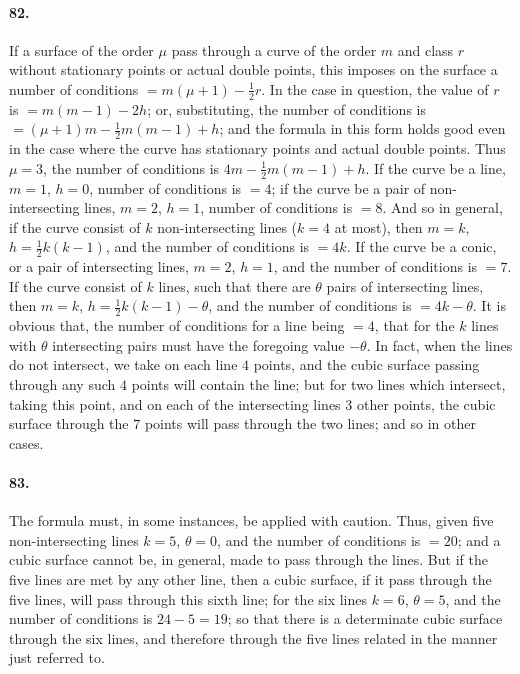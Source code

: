 \documentclass[11pt]{article}
\begin{document}
\paragraph{82.}
If a surface of the order $\mu$ pass through a curve of the order $m$
and class $r$ without stationary points or actual double points, this
imposes on the surface a number of conditions
$=m(\mu+1)-\tfrac{1}{2}r$. In the case in question, the value of $r$ is
$=m(m-1)-2h$; or, substituting, the number of conditions is
$=(\mu+1)m-\tfrac{1}{2}m(m-1)+h$; and the formula in this form holds
good even in the case where the curve has stationary points and actual
double points. Thus $\mu=3$, the number of conditions is
$4m-\tfrac{1}{2}m(m-1)+h$. If the curve be a line, $m=1$, $h=0$, number
of conditions is $=4$; if the curve be a pair of non-intersecting lines,
$m=2$, $h=1$, number of conditions is $=8$. And so in general, if the
curve consist of $k$ non-intersecting lines ($k=4$ at most), then $m=k$,
$h=\tfrac{1}{2}k(k-1)$, and the number of conditions is $=4k$. If the
curve be a conic, or a pair of intersecting lines, $m=2$, $h=1$, and the
number of conditions is $=7$. If the curve consist of $k$ lines, such
that there are $\theta$ pairs of intersecting lines, then $m=k$,
$h=\tfrac{1}{2}k(k-1)-\theta$, and the number of conditions is
$=4k-\theta$. It is obvious that, the number of conditions for a line
being $=4$, that for the $k$ lines with $\theta$ intersecting pairs
must have the foregoing value $-\theta$. In fact, when the lines do not
intersect, we take on each line $4$ points, and the cubic surface passing
through any such $4$ points will contain the line; but for two lines
which intersect, taking this point, and on each of the intersecting
lines $3$ other points, the cubic surface through the $7$ points will
pass through the two lines; and so in other cases.

\medskip

\paragraph{83.}
The formula must, in some instances, be applied with caution. Thus,
given five non-intersecting lines $k=5$, $\theta=0$, and the number of
conditions is $=20$; and a cubic surface cannot be, in general, made to
pass through the lines. But if the five lines are met by any other line,
then a cubic surface, if it pass through the five lines, will pass
through this sixth line; for the six lines $k=6$, $\theta=5$, and the
number of conditions is $24-5=19$; so that there is a determinate cubic
surface through the six lines, and therefore through the five lines
related in the manner just referred to.
\end{document}
